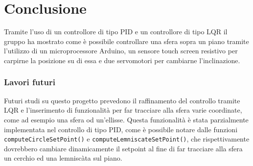 \chapter{Conclusione}

Tramite l'uso di un controllore di tipo PID e un controllore di tipo LQR il gruppo ha mostrato come è possibile controllare una sfera sopra un piano tramite l'utilizzo di un microprocessore Arduino, un sensore touch screen resistivo per carpirne la posizione su di essa e due servomotori per cambiarne l'inclinazione.

\subsection{Lavori futuri}

Futuri studi su questo progetto prevedono il raffinamento del controllo tramite LQR e l'inserimento di funzionalità per far tracciare alla sfera varie coordinate, come ad esempio una sfera od un'ellisse. Questa funzionalità è stata parzialmente implementata nel controllo di tipo PID, come è possibile notare dalle funzioni \texttt{computeCircleSetPoint()} e \texttt{computeLemniscateSetPoint()}, che rispettivamente dovrebbero cambiare dinamicamente il setpoint al fine di far tracciare alla sfera un cerchio ed una lemniscàta sul piano.